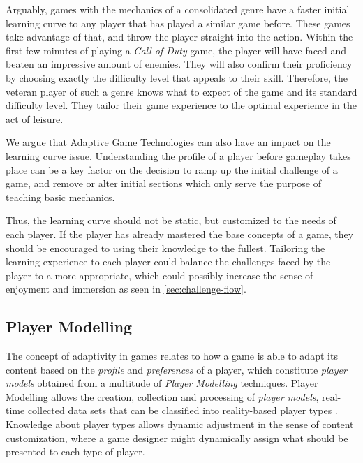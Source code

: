 Arguably, games with the mechanics of a consolidated genre have a faster initial learning curve to any player that has played a similar game before. These games take advantage of that, and throw the player straight into the action. Within the first few minutes of playing a \emph{Call of Duty} game, the player will have faced and beaten an impressive amount of enemies. They will also confirm their proficiency by choosing exactly the difficulty level that appeals to their skill. Therefore, the veteran player of such a genre knows what to expect of the game and its standard difficulty level. They tailor their game experience to the optimal experience in the act of leisure.

We argue that Adaptive Game Technologies can also have an impact on the learning curve issue. Understanding the profile of a player before gameplay takes place can be a key factor on the decision to ramp up the initial challenge of a game, and remove or alter initial sections which only serve the purpose of teaching basic mechanics.

Thus, the learning curve should not be static, but customized to the needs of each player. If the player has already mastered the base concepts of a game, they should be encouraged to using their knowledge to the fullest. Tailoring the learning experience to each player could balance the challenges faced by the player to a more appropriate, which could possibly increase the sense of enjoyment and immersion as seen in \autoref{sec:challenge-flow}.


\subsection{Player Modelling}

The concept of adaptivity in games relates to how a game is able to adapt its content based on the \emph{profile} and \emph{preferences} of a player, which constitute \emph{player models} obtained from a multitude of \emph{Player Modelling} techniques. Player Modelling allows the creation, collection and processing of \emph{player models}, real-time collected data sets that can be classified into reality-based player types \cite{ARTICLE_DynamicPlayerModelling}. Knowledge about player types allows dynamic adjustment in the sense of content customization, where a game designer might dynamically assign what should be presented to each type of player.

